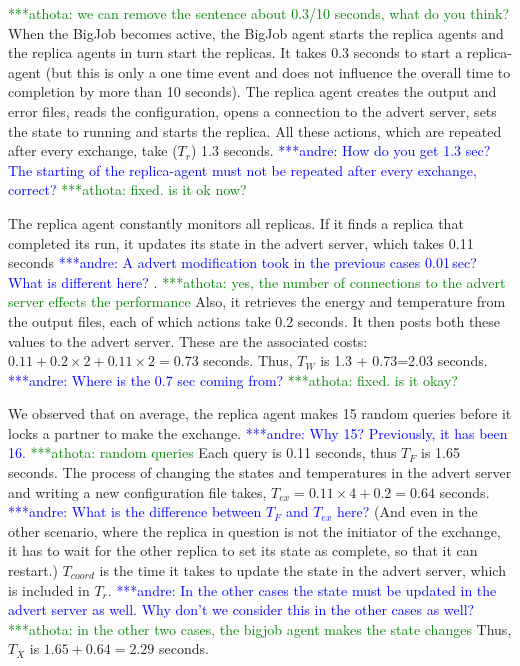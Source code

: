 \documentclass{rspublic}
\newcommand{\alnote}[1]{ {\textcolor{blue} { ***andre: #1 }}}
\newcommand{\athotanote}[1]{ {\textcolor{green} { ***athota: #1 }}}
\newcommand{\alnote}[1]{}
\newcommand{\athotanote}[1]{}
\begin{document}
\athotanote{we can remove the sentence about 0.3/10 seconds, what do you think?}When the BigJob becomes active, the BigJob agent starts the replica
agents and the replica agents in turn start the replicas. It takes 0.3
seconds to start a replica-agent (but this is only a one time event and does not influence the overall time to completion by more than 10 seconds). The replica agent creates the
output and error files, reads the configuration, opens a connection to the advert server, sets the state to running and starts the
replica. All these actions, which are repeated after every exchange,
take ($T_r$) 1.3 seconds. \alnote{How do you get 1.3 sec? The starting of the replica-agent
must not be repeated after every exchange, correct?} \athotanote{fixed. is it ok now?}

The replica agent constantly monitors all replicas. If it finds
a replica that completed its run, it updates its state in the advert
server, which takes 0.11 seconds \alnote{A advert modification took in the previous
cases 0.01\,sec? What is different here?}.\athotanote{yes, the number of connections to the advert server effects the performance} Also, it retrieves the energy and
temperature from the output files, each of which actions take 0.2
seconds. It then posts both these values to the advert server. These are the associated costs: $0.11+0.2\times2+0.11\times2=0.73$ seconds.  Thus,
$T_W$ is 1.3 + 0.73=2.03 seconds.\alnote{Where is the 0.7 sec coming from?} \athotanote{fixed. is it okay?}

We observed that on average, the replica agent makes 15 random queries before
it locks a partner to make the exchange. \alnote{Why 15? Previously, it has been 16.} \athotanote{random queries}
Each query is 0.11 seconds, thus $T_F$ is 1.65
seconds. The process of changing the states
and temperatures in the advert server and writing a new
configuration file takes, $T_{ex} = 0.11\times 4 +0.2 = 0.64$ seconds.
\alnote{What is the difference between $T_F$ and $T_{ex}$ here?} 
(And even in the other scenario, where the replica in question is not the
initiator of the exchange, it has to wait for the other replica to set its state as complete, so that it can restart.) $T_{coord}$ is the time it takes to
update the state in the advert server, which is included in $T_r$. \alnote{In the other
cases the state must be updated in the advert server as well. Why don't we consider
this in the other cases as well?}\athotanote{in the other two cases, the bigjob agent makes the state changes} Thus,
$T_{X}$ is $1.65+0.64= 2.29$ seconds.
\end{document}
